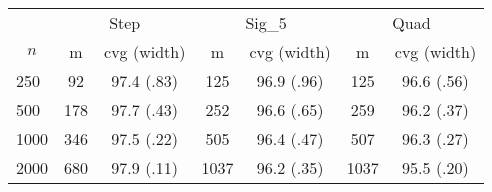 \documentclass{article}
\begin{document}
\begin{tabular}{lcccccc}
   \toprule
 
           & \multicolumn{2}{c}{Step}& \multicolumn{2}{c}{Sig\_5}& \multicolumn{2}{c}{Quad} \\ 
             \cmidrule(l{2pt}r{2pt}){2-3} \cmidrule(l{2pt}r{2pt}){4-5} \cmidrule(l{2pt}r{2pt}){6-7} 
             \multicolumn{1}{c}{$n$} & \multicolumn{1}{c}{m}& \multicolumn{1}{c}{cvg (width)}& \multicolumn{1}{c}{m}& \multicolumn{1}{c}{cvg (width)}& \multicolumn{1}{c}{m}& \multicolumn{1}{c}{cvg (width)} \\ \midrule 
        250 & 92 & 97.4 (.83) & 125 & 96.9 (.96) & 125 & 96.6 (.56) \\ 
  500 & 178 & 97.7 (.43) & 252 & 96.6 (.65) & 259 & 96.2 (.37) \\ 
  1000 & 346 & 97.5 (.22) & 505 & 96.4 (.47) & 507 & 96.3 (.27) \\ 
  2000 & 680 & 97.9 (.11) & 1037 & 96.2 (.35) & 1037 & 95.5 (.20) \\ 
   \hline
\end{tabular}
\end{document}
